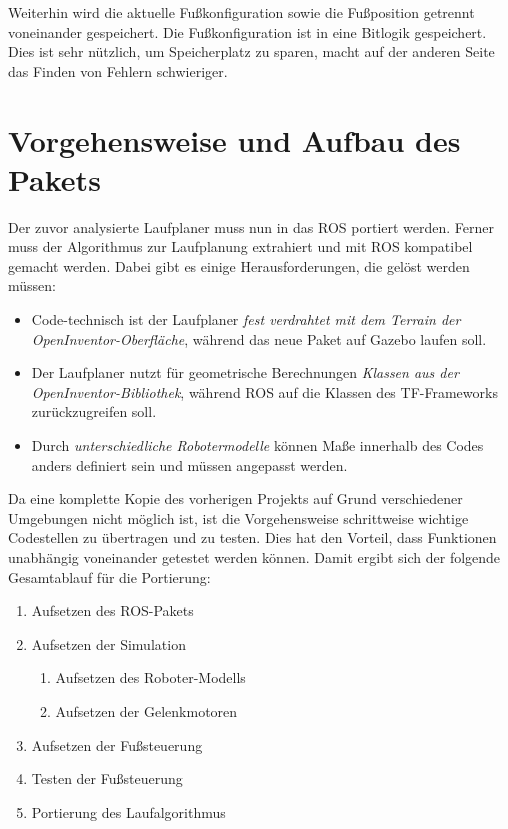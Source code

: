 \begin{itemize}
Weiterhin wird die aktuelle Fußkonfiguration sowie die Fußposition getrennt voneinander gespeichert. Die Fußkonfiguration ist in eine Bitlogik gespeichert. Dies ist sehr nützlich, um Speicherplatz zu sparen, macht auf der anderen Seite das Finden von Fehlern schwieriger.

\section{Vorgehensweise und Aufbau des Pakets}

Der zuvor analysierte Laufplaner muss nun in das \ac{ROS} portiert werden. Ferner muss der Algorithmus zur Laufplanung extrahiert und mit \ac{ROS} kompatibel gemacht werden. Dabei gibt es einige Herausforderungen, die gelöst werden müssen:
\begin{itemize}
  \item Code-technisch ist der Laufplaner \emph{fest verdrahtet mit dem Terrain der OpenInventor-Oberfläche}, während das neue Paket auf Gazebo laufen soll.
  \item Der Laufplaner nutzt für geometrische Berechnungen \emph{Klassen aus der OpenInventor-Bibliothek}, während \ac{ROS} auf die Klassen des TF-Frameworks zurückzugreifen soll.
  \item Durch \emph{unterschiedliche Robotermodelle} können Maße innerhalb des Codes anders definiert sein und müssen angepasst werden.
\end{itemize}

Da eine komplette Kopie des vorherigen Projekts auf Grund verschiedener Umgebungen nicht möglich ist, ist die Vorgehensweise schrittweise wichtige Codestellen zu übertragen und zu testen. Dies hat den Vorteil, dass Funktionen unabhängig voneinander getestet werden können. Damit ergibt sich der folgende Gesamtablauf für die Portierung:
\begin{enumerate}
  \item Aufsetzen des \ac{ROS}-Pakets
  \item Aufsetzen der Simulation
  \begin{enumerate}
    \item Aufsetzen des Roboter-Modells
    \item Aufsetzen der Gelenkmotoren
  \end{enumerate}
  \item Aufsetzen der Fußsteuerung
  \item Testen der Fußsteuerung
  \item Portierung des Laufalgorithmus
\end{enumerate}


\end{itemize}
